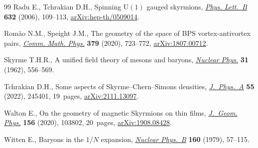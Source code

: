 \documentclass[pdftex]{sigma}
\newcommand{\1}{{\mathbb{1}}}
\numberwithin{equation}{section}
\begin{document}
\begin{thebibliography}{99}
Radu E., Tchrakian D.H., Spinning $\mathrm{U}(1)$ gauged skyrmions,
 \href{https://doi.org/10.1016/j.physletb.2005.10.020}{\textit{Phys. Lett.~B}} \textbf{632} (2006), 109--113,
 \href{https://arxiv.org/abs/hep-th/0509014}{arXiv:hep-th/0509014}.

Rom\~ao N.M., Speight J.M., The geometry of the space of {BPS}
 vortex-antivortex pairs, \href{https://doi.org/10.1007/s00220-020-03824-y}{\textit{Comm. Math. Phys.}} \textbf{379} (2020),
 723--772, \href{https://arxiv.org/abs/1807.00712}{arXiv:1807.00712}.

Skyrme T.H.R., A unified field theory of mesons and baryons, \href{https://doi.org/10.1016/0029-5582(62)90775-7}{\textit{Nuclear
 Phys.}} \textbf{31} (1962), 556--569.

Tchrakian D.H., Some aspects of {S}kyrme--{C}hern--{S}imons densities,
 \href{https://doi.org/10.1088/1751-8121/ac68b3}{\textit{J.~Phys.~A}} \textbf{55} (2022), 245401, 19~pages,
 \href{https://arxiv.org/abs/2111.13097}{arXiv:2111.13097}.

Walton E., On the geometry of magnetic {S}kyrmions on thin films,
 \href{https://doi.org/10.1016/j.geomphys.2020.103802}{\textit{J.~Geom. Phys.}} \textbf{156} (2020), 103802, 20~pages,
 \href{https://arxiv.org/abs/1908.08428}{arXiv:1908.08428}.

Witten E., Baryons in the $1/N$ expansion, \href{https://doi.org/10.1016/0550-3213(79)90232-3}{\textit{Nuclear Phys.~B}}
 \textbf{160} (1979), 57--115.

\end{thebibliography}\LastPageEnding
\end{document}
